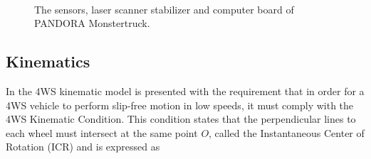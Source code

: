 \documentclass[conference]{IEEEtran}
\begin{document}
\begin{figure}[!ht]
	\centering
	\hspace{0.7cm}	
	\hspace{0.7cm}	
	\\
	\hspace{0.8cm}
	\caption{The sensors, laser scanner stabilizer and computer board of PANDORA Monstertruck.}
\end{figure}

\subsection{Kinematics}
In \cite{vehicle_dynamics} the 4WS kinematic model is presented with the requirement that in order for a 4WS vehicle to perform slip-free motion in low speeds, it must comply with the 4WS Kinematic Condition. This condition states that the perpendicular lines to each wheel must intersect at the same point $O$, called the Instantaneous Center of Rotation (ICR) and is expressed as
\end{document}
